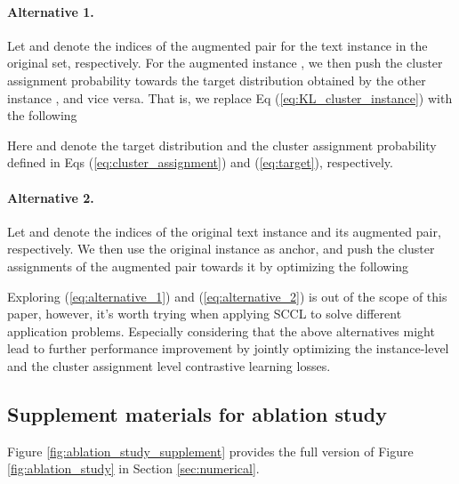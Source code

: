\documentclass[11pt]{article}
\begin{document}
\paragraph{Alternative 1.}{Let  and  denote the indices of the augmented pair for the  text instance in the original set, respectively. For the augmented instance , we then push the cluster assignment probability towards the target distribution obtained by the other instance , and vice versa.  That is, we replace Eq (\ref{eq:KL_cluster_instance}) with the following  

Here  and  denote the target distribution and the cluster assignment probability defined in Eqs (\ref{eq:cluster_assignment}) and (\ref{eq:target}), respectively.
}

\paragraph{Alternative 2.}{Let  and  denote the indices of the original text instance and its augmented pair, respectively. We then use the original instance as anchor, and push the cluster assignments of the augmented pair towards it by optimizing the following


Exploring (\ref{eq:alternative_1}) and (\ref{eq:alternative_2}) is out of the scope of this paper, however, it's worth trying when applying SCCL to solve different application problems. Especially considering that the above alternatives might lead to further performance improvement by jointly optimizing the instance-level and the cluster assignment level contrastive learning losses. 
}



\subsection{Supplement materials for ablation study}
\label{appdix:ablation}
Figure \ref{fig:ablation_study_supplement} provides the full version of Figure \ref{fig:ablation_study} in Section \ref{sec:numerical}.
\end{document}
